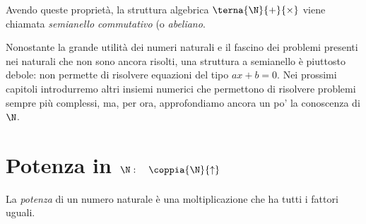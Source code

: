 
Avendo queste proprietà, la struttura algebrica \(\terna{\N}{+}{\times}\) 
viene chiamata \emph{semianello commutativo} (o \emph{abeliano}.

\begin{osservazione}{}{}
Nonostante la grande utilità dei numeri naturali e il fascino dei problemi 
presenti nei naturali che non sono ancora risolti, una struttura a 
semianello è piuttosto debole:
non permette di risolvere equazioni del tipo \(ax +b = 0\).
Nei prossimi capitoli introdurremo altri insiemi numerici che permettono di 
risolvere problemi sempre più complessi, ma, per ora, approfondiamo ancora un 
po' la conoscenza di \(\N\).
\end{osservazione}


% 

\section{Potenza in $\N: \quad \coppia{\N}{\uparrow}$}
\label{sec:nat_potenza}

La \emph{potenza} di un numero naturale è una moltiplicazione che ha tutti 
i fattori uguali.

